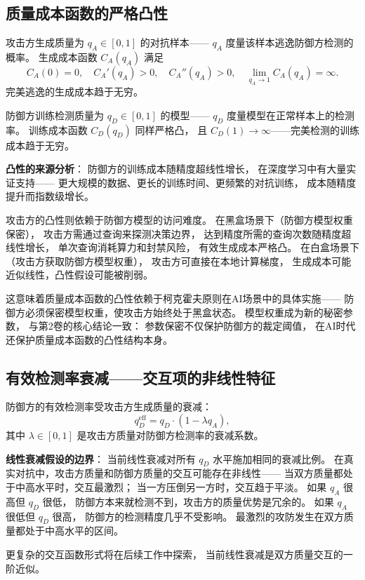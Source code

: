 \documentclass[11pt,a4paper]{article}
\begin{document}
\subsection{质量成本函数的严格凸性}

攻击方生成质量为 \(q_A \in [0,1]\) 的对抗样本——
\(q_A\) 度量该样本逃逸防御方检测的概率。
生成成本函数 \(C_A(q_A)\) 满足
\[
C_A(0) = 0, \quad C_A'(q_A) > 0, \quad C_A''(q_A) > 0,
\quad \lim_{q_A \to 1} C_A(q_A) = \infty.
\]
完美逃逸的生成成本趋于无穷。

防御方训练检测质量为 \(q_D \in [0,1]\) 的模型——
\(q_D\) 度量模型在正常样本上的检测率。
训练成本函数 \(C_D(q_D)\) 同样严格凸，
且 \(C_D(1) \to \infty\)——完美检测的训练成本趋于无穷。

\textbf{凸性的来源分析}：
防御方的训练成本随精度超线性增长，
在深度学习中有大量实证支持——
更大规模的数据、更长的训练时间、更频繁的对抗训练，
成本随精度提升而指数级增长。

攻击方的凸性则依赖于防御方模型的访问难度。
在黑盒场景下（防御方模型权重保密），
攻击方需通过查询来探测决策边界，
达到精度所需的查询次数随精度超线性增长，
单次查询消耗算力和封禁风险，
有效生成成本严格凸。
在白盒场景下（攻击方获取防御方模型权重），
攻击方可直接在本地计算梯度，
生成成本可能近似线性，凸性假设可能被削弱。

这意味着质量成本函数的凸性依赖于柯克霍夫原则在AI场景中的具体实施——
防御方必须保密模型权重，使攻击方始终处于黑盒状态。
模型权重成为新的秘密参数，
与第2卷的核心结论一致：
参数保密不仅保护防御方的裁定阈值，
在AI时代还保护质量成本函数的凸性结构本身。

\subsection{有效检测率衰减——交互项的非线性特征}

防御方的有效检测率受攻击方生成质量的衰减：
\[
q_D^{\text{eff}} = q_D \cdot (1 - \lambda q_A),
\]
其中 \(\lambda \in [0,1]\) 是攻击方质量对防御方检测率的衰减系数。

\textbf{线性衰减假设的边界}：
当前线性衰减对所有 \(q_D\) 水平施加相同的衰减比例。
在真实对抗中，攻击方质量和防御方质量的交互可能存在非线性——
当双方质量都处于中高水平时，交互最激烈；
当一方压倒另一方时，交互趋于平淡。
如果 \(q_A\) 很高但 \(q_D\) 很低，
防御方本来就检测不到，攻击方的质量优势是冗余的。
如果 \(q_A\) 很低但 \(q_D\) 很高，
防御方的检测精度几乎不受影响。
最激烈的攻防发生在双方质量都处于中高水平的区间。

更复杂的交互函数形式将在后续工作中探索，
当前线性衰减是双方质量交互的一阶近似。
\end{document}
